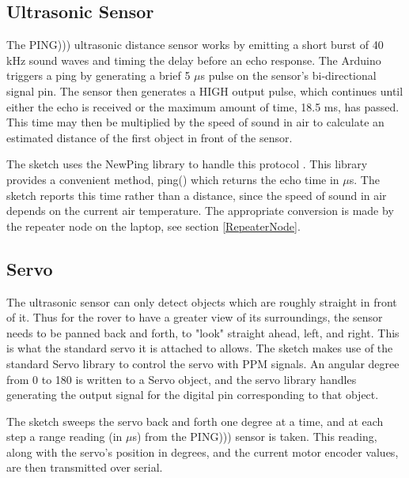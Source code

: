 \subsection{Ultrasonic Sensor}
The PING))) ultrasonic distance sensor works by emitting a short burst of 40 kHz sound waves and timing the delay before an echo response. The Arduino triggers a ping by generating a brief 5 \(\mu\)s pulse on the sensor's bi-directional signal pin. The sensor then generates a HIGH output pulse, which continues until either the echo is received or the maximum amount of time, 18.5 ms, has passed. This time may then be multiplied by the speed of sound in air to calculate an estimated distance of the first object in front of the sensor. \cite{pingDocumentation}

The sketch uses the NewPing library to handle this protocol \cite{newPing}. This library provides a convenient method, ping() which returns the echo time in \(\mu\)s. The sketch reports this time rather than a distance, since the speed of sound in air depends on the current air temperature. The appropriate conversion is made by the repeater node on the laptop, see section \ref{RepeaterNode}.

\subsection{Servo}
The ultrasonic sensor can only detect objects which are roughly straight in front of it. Thus for the rover to have a greater view of its surroundings, the sensor needs to be panned back and forth, to "look" straight ahead, left, and right. This is what the standard servo it is attached to allows. The sketch makes use of the standard Servo library to control the servo with PPM signals. An angular degree from 0 to 180 is written to a Servo object, and the servo library handles generating the output signal for the digital pin corresponding to that object.

The sketch sweeps the servo back and forth one degree at a time, and at each step a range reading (in \(\mu\)s) from the PING))) sensor is taken. This reading, along with the servo's position in degrees, and the current motor encoder values, are then transmitted over serial.

